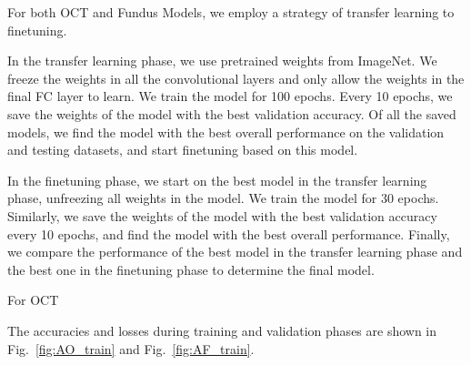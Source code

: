 \documentclass{article}
\begin{document}
	For both OCT and Fundus Models, we employ a strategy of transfer learning to finetuning. 
	
	In the transfer learning phase, we use pretrained weights from ImageNet. We freeze the weights in all the convolutional layers and only allow the weights in the final FC layer to learn. We train the model for 100 epochs. Every 10 epochs, we save the weights of the model with the best validation accuracy. Of all the saved models, we find the model with the best overall performance on the validation and testing datasets, and start finetuning based on this model. 
	
	In the finetuning phase, we start on the best model in the transfer learning phase, unfreezing all weights in the model. We train the model for 30 epochs. Similarly, we save the weights of the model with the best validation accuracy every 10 epochs, and find the model with the best overall performance. Finally, we compare the performance of the best model in the transfer learning phase and the best one in the finetuning phase to determine the final model. 
	
	For OCT
	
	The accuracies and losses during training and validation phases are shown in Fig.~\ref{fig:AO_train} and Fig.~\ref{fig:AF_train}. 
	
\end{document}
